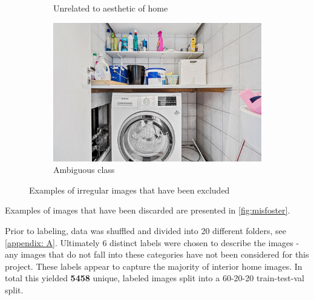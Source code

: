 \begin{figure}[H]
\begin{subfigure}[b]{0.4\textwidth}
      \caption{Unrelated to aesthetic of home}
      \label{fig:3}
    \end{subfigure}
    \begin{subfigure}[b]{0.4\textwidth}
      \includegraphics[width=\textwidth]{pictures/random/washer}
      \caption{Ambiguous class}
      \label{fig:4}
    \end{subfigure}
    \caption{Examples of irregular images that have been excluded}
    \label{fig:misfoster}
\end{figure}

Examples of images that have been discarded are presented in \autoref{fig:misfoster}.

Prior to labeling, data was shuffled and divided into 20 different folders, see \autoref{appendix: A}.
Ultimately 6 distinct labels were chosen to describe the images - any images that do not fall into these categories have not been considered for this project.
These labels appear to capture the majority of interior home images. In total this yielded \textbf{5458} unique, labeled images split into a 60-20-20 train-test-val split.
\begin{table}[H]
    \caption{Labeled images from various danish real-estate pages}
    \label{tab:datadist}
\end{table}